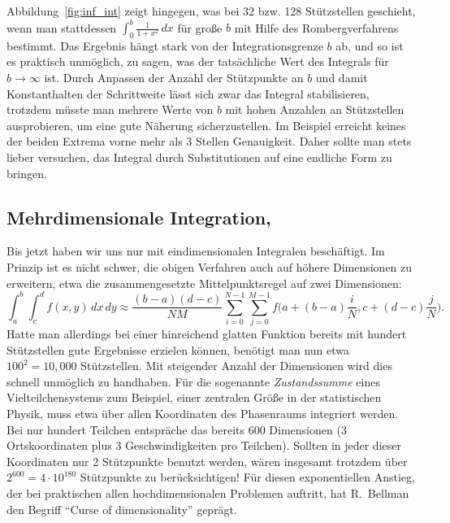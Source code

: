 Abbildung~\ref{fig:inf_int} zeigt hingegen, was bei 32 bzw. 128
Stützstellen geschieht, wenn man stattdessen $\int_0^b
\frac{1}{1+x^2}\, dx$ für große $b$ mit Hilfe des Rombergverfahrens
bestimmt. Das Ergebnis hängt stark von der Integrationsgrenze $b$ ab,
und so ist es praktisch unmöglich, zu sagen, was der tatsächliche Wert
des Integrals für $b \rightarrow \infty$ ist. Durch Anpassen der
Anzahl der Stützpunkte an $b$ und damit Konstanthalten der
Schrittweite lässt sich zwar das Integral stabilisieren, trotzdem
müsste man mehrere Werte von $b$ mit hohen Anzahlen an Stützstellen
ausprobieren, um eine gute Näherung sicherzustellen. Im Beispiel
erreicht keines der beiden Extrema vorne mehr als 3 Stellen
Genauigkeit. Daher sollte man stets lieber versuchen, das Integral
durch Substitutionen auf eine endliche Form zu bringen.

\subsection{Mehrdimensionale Integration, }
\label{sec:mc}

Bis jetzt haben wir uns nur mit eindimensionalen Integralen
beschäftigt. Im Prinzip ist es nicht schwer, die obigen Verfahren auch
auf höhere Dimensionen zu erweitern, etwa die zusammengesetzte 
Mittelpunktsregel auf zwei Dimensionen:
\begin{equation}
  \int_a^b \int_c^d f(x, y)\, dx\, dy \approx
  \frac{(b-a)(d-c)}{NM} \sum_{i=0}^{N-1} \sum_{j=0}^{M-1}
  f\bigl(a + (b-a)\frac{i}{N}, c + (d-c)\frac{j}{N}\bigr).
\end{equation}
Hatte man allerdings bei einer hinreichend glatten Funktion bereits
mit hundert Stützstellen gute Ergebnisse erzielen können, benötigt man
nun etwa $100^2=10,000$ Stützstellen.  Mit steigender Anzahl der
Dimensionen wird dies schnell unmöglich zu handhaben. Für die
sogenannte \emph{Zustandssumme} eines Vielteilchensystems zum
Beispiel, einer zentralen Größe in der statistischen Physik, muss etwa
über allen Koordinaten des Phasenraums integriert werden.  Bei nur
hundert Teilchen entspräche das bereits 600 Dimensionen ($3$
Ortskoordinaten plus $3$ Geschwindigkeiten pro Teilchen). Sollten in
jeder dieser Koordinaten nur 2 Stützpunkte benutzt werden, wären
insgesamt trotzdem über $2^{600}= 4\cdot 10^{180}$ Stützpunkte zu
berücksichtigen! Für diesen exponentiellen Anstieg, der bei
praktischen allen hochdimensionalen Problemen auftritt, hat R.~Bellman
den Begriff "`Curse of dimensionality"' geprägt.

